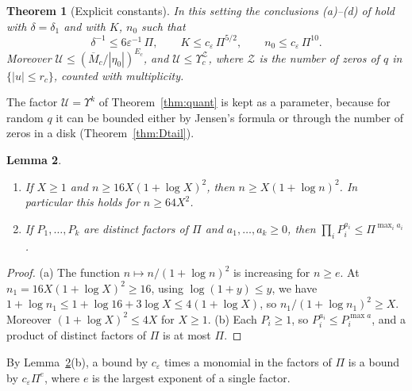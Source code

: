 \documentclass[11pt]{amsart}
\newtheorem{theorem}{Theorem}[section]
\newtheorem{lemma}[theorem]{Lemma}
\theoremstyle{definition}
\theoremstyle{remark}
\numberwithin{equation}{section}
\newcommand{\eps}{\varepsilon}
\begin{document}
\begin{theorem}[Explicit constants]\label{thm:collision-explicit}
In this setting the conclusions (a)--(d) of \cite[Theorem~\ref{M-thm:collision}]{Main} hold with $\delta=\delta_1$ and with $K$, $n_0$ such that
\[
\delta^{-1}\le6\eps^{-1}\,\Pi,\qquad K\le c_\eps\,\Pi^{5/2},\qquad n_0\le c_\eps\,\Pi^{10}.
\]
Moreover $\mathcal U\le(\overline M_c/|\eta_0|)^{E_c}$, and $\mathcal U\le\Upsilon_c^{\mathcal Z}$, where $\mathcal Z$ is the number of zeros of $q$ in $\{|u|\le r_c\}$, counted with multiplicity.
\end{theorem}

The factor $\mathcal U=\Upsilon^{k}$ of Theorem~\ref{thm:quant} is kept as a parameter, because for random $q$ it can be bounded either by Jensen's formula or through the number of zeros in a disk (Theorem~\ref{thm:Dtail}).

\begin{lemma}\label{lem:logs}
\begin{enumerate}
\item[(a)] If $X\ge1$ and $n\ge16X(1+\log X)^2$, then $n\ge X(1+\log n)^2$. In particular this holds for $n\ge64X^2$.
\item[(b)] If $P_1,\dots,P_k$ are distinct factors of $\Pi$ and $a_1,\dots,a_k\ge0$, then $\prod_iP_i^{a_i}\le\Pi^{\max_ia_i}$.
\end{enumerate}
\end{lemma}

\begin{proof}
(a) The function $n\mapsto n/(1+\log n)^2$ is increasing for $n\ge e$. At $n_1=16X(1+\log X)^2\ge16$, using $\log(1+y)\le y$, we have $1+\log n_1\le1+\log16+3\log X\le4(1+\log X)$, so $n_1/(1+\log n_1)^2\ge X$. Moreover $(1+\log X)^2\le4X$ for $X\ge1$. (b) Each $P_i\ge1$, so $P_i^{a_i}\le P_i^{\max a}$, and a product of distinct factors of $\Pi$ is at most $\Pi$.
\end{proof}

By Lemma~\ref{lem:logs}(b), a bound by $c_\eps$ times a monomial in the factors of $\Pi$ is a bound by $c_\eps\Pi^e$, where $e$ is the largest exponent of a single factor.
\end{document}
